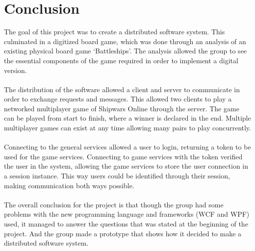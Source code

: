 
\section{Conclusion}
The goal of this project was to create a distributed software system.
This culminated in a digitized board game, which was done through an analysis
of an existing physical board game ‘Battleships’. The analysis allowed the
 group to see the essential components of the game required in order to
 implement a digital version.
\\
\\
The distribution of the software allowed a client and server to communicate
in order to exchange requests and messages. This allowed two clients to play
 a networked multiplayer game of Shipwars Online through the server. The game
  can be played from start to finish, where a winner is declared in the end.
   Multiple multiplayer games can exist at any time allowing many pairs to
   play concurrently.
\\
\\
Connecting to the general services allowed a user to login, returning a token
to be used for the game services. Connecting to game services with the token
 verified the user in the system, allowing the game services to store the user
  connection in a session instance. This way users could be identified through
  their session, making communication both ways possible.
\\
\\
The overall conclusion for the project is that though the group had some
 problems with the new programming language and frameworks (WCF and WPF)
  used, it managed to answer the questions that was stated at the beginning
   of the project. And the group made a prototype that shows how it decided
    to make a distributed software system.
